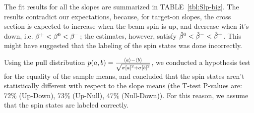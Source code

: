 \documentclass[reprint, superscriptaddress]{revtex4-1}
\begin{document}
\newcommand{\avg}[1]{\langle #1 \rangle}
The fit results for all the slopes are summarized in TABLE~\ref{tbl:Slp-big}. The results contradict our expectations, because, for target-on slopes, the cross section is expected to increase when the beam spin is up, and decrease when it's down, i.e. $\slp^+ < \slp^0 < \slp^-$; the estimates, however, satisfy $\slp*^0 < \slp*^- < \slp*^+$. This might have suggested that the labeling of the spin states was done incorrectly. 

Using the pull distribution $p(a,b) = \frac{\avg{a}-\avg{b}}{\sqrt{\SE{a}^2+\SE{b}^2}}$, we conducted a hypothesis test for the equality of the sample means, and concluded that the spin states aren't statistically different with respect to the slope means (the T-test P-values are: 72\% (Up-Down), 73\% (Up-Null), 47\% (Null-Down)). For this reason, we assume that the spin states are labeled correctly.
\end{document}
